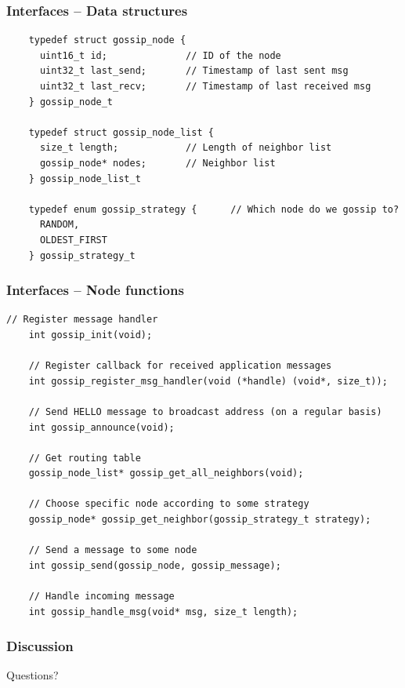 \documentclass[ngerman]{beamer}
\begin{document}
\begin{frame}[fragile]
  \frametitle{Interfaces -- Data structures}
  \begin{lstlisting}
    typedef struct gossip_node {
      uint16_t id;              // ID of the node
      uint32_t last_send;       // Timestamp of last sent msg
      uint32_t last_recv;       // Timestamp of last received msg
    } gossip_node_t

    typedef struct gossip_node_list {
      size_t length;            // Length of neighbor list
      gossip_node* nodes;       // Neighbor list
    } gossip_node_list_t

    typedef enum gossip_strategy {      // Which node do we gossip to?
      RANDOM,
      OLDEST_FIRST
    } gossip_strategy_t
  \end{lstlisting}
\end{frame}

\begin{frame}[fragile]
  \frametitle{Interfaces -- Node functions}
  \begin{lstlisting}[basicstyle=\tiny\ttfamily]
    // Register message handler
    int gossip_init(void);

    // Register callback for received application messages
    int gossip_register_msg_handler(void (*handle) (void*, size_t));

    // Send HELLO message to broadcast address (on a regular basis) 
    int gossip_announce(void);

    // Get routing table
    gossip_node_list* gossip_get_all_neighbors(void);

    // Choose specific node according to some strategy
    gossip_node* gossip_get_neighbor(gossip_strategy_t strategy);

    // Send a message to some node
    int gossip_send(gossip_node, gossip_message);

    // Handle incoming message
    int gossip_handle_msg(void* msg, size_t length);
  \end{lstlisting}
\end{frame}

\begin{frame}
 \frametitle{Discussion}
 \huge{Questions?}
\end{frame}
\end{document}
